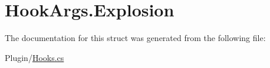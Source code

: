 \hypertarget{structOTA_1_1Plugin_1_1HookArgs_1_1Explosion}{}\section{Hook\+Args.\+Explosion}
\label{structOTA_1_1Plugin_1_1HookArgs_1_1Explosion}


The documentation for this struct was generated from the following file\+:\begin{DoxyCompactItemize}
\item 
Plugin/\hyperlink{Hooks_8cs}{Hooks.\+cs}\end{DoxyCompactItemize}
